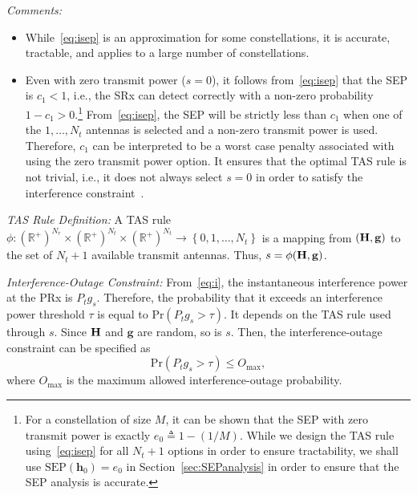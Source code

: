 \documentclass[12pt,draftcls,peerreview,onecolumn]{IEEEtran}
\newcommand{\brac}[1]{\left({#1}\right)}
\newcommand{\define}{\triangleq}
\newcommand{\ie}{{i.e.}}
\newcommand{\mtx}[1]{{\bf #1}} %
\newcommand{\prob}[1]{\text{Pr}\brac{#1}}
\newcommand{\SEP}{\text{SEP}}
\newcommand{\nx}{{0}}
\newcommand{\Nt}{{N_t}}
\newcommand{\Nr}{{N_r}}
\newcommand{\Pt}{{P_t}}
\newcommand{\such}{h}
\newcommand{\puch}{g}
\newcommand{\hk}[1]{{\such_{#1}}}
\newcommand{\gk}[1]{{\puch_{#1}}}
\newcommand{\h}{\mathbf{\such}}
\newcommand{\g}{\mathbf{\puch}}
\newcommand{\outmax}{O_{\text{max}}}
\newcommand{\itau}{\tau}
\newcommand{\cone}{c_{1}}
\newcommand{\allopts}{\left\{\nx,1,\ldots,\Nt\right\}}
\newcommand{\asrule}{\phi}
\newcommand{\zerosep}{e_0}
\newcommand{\Hmx}{\mtx{H}}
\begin{document}
{\em Comments:}
\begin{itemize}
\item While~\eqref{eq:isep} is an approximation for some constellations,  it is accurate, tractable, and applies to a large number of constellations. %

\item Even with zero transmit power ($s=\nx$), it follows from~\eqref{eq:isep} that the SEP is $\cone<1$, \ie, the SRx can detect correctly with a non-zero probability $1-\cone > 0$.\footnote{For a constellation of size $M$, it can be shown that the SEP with zero transmit power is exactly $\zerosep\define 1-\left(1/M\right)$. While we design the TAS rule using~\eqref{eq:isep} for all $\Nt+1$ options in order to ensure tractability, we shall use $\SEP(\h_0) = \zerosep$ in Section~\ref{sec:SEPanalysis} in order to ensure that the SEP analysis is accurate.} From~\eqref{eq:isep}, the SEP will be strictly less than $\cone$ when one of the $1,\ldots,\Nt$ antennas is selected and a non-zero transmit power is used. Therefore, $\cone$ can be interpreted to be a worst case penalty associated with using the zero transmit power option. It ensures that the optimal TAS rule is not trivial, \ie, it does not always select $s=\nx$ in order to satisfy the interference constraint~\cite{Kashyap_2014_TCOM,Sarvendranath_2013_TCOM}. 	
\end{itemize}


{\em TAS Rule Definition:} A TAS rule $\asrule:\brac{\mathbb{R}^{+}}^{\Nr}\times\brac{\mathbb{R}^{+}}^{\Nt} \times \brac{\mathbb{R}^{+}}^{\Nt} \rightarrow \allopts$ is a mapping from $\left(\Hmx,\g\right)$ to the set of $\Nt+1$ available transmit antennas. Thus, $s = \phi(\Hmx,\g)$.

{\em Interference-Outage Constraint:}
From~\eqref{eq:i}, the instantaneous interference power at the PRx is $\Pt\gk{s}$. Therefore, the probability that it exceeds an interference power threshold $\itau$ is equal to $\prob{\Pt\gk{s}>\itau}$. It depends on the TAS rule used through $s$. Since $\Hmx$ and $\g$ are random, so is $s$. Then, the interference-outage constraint can be specified as 
\begin{equation}
\prob{\Pt\gk{s}>\itau} \leq \outmax,
\label{eq:iop_cons}
\end{equation}
where $\outmax$ is the maximum allowed interference-outage probability. 
\end{document}

